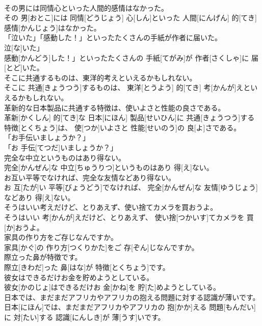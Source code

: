 \documentclass[8pt]{extreport}
\begin{document}
\begin{CJK}{UTF8}{min}
\\	その男には同情心といった人間的感情はなかった。	
\\	その 男[おとこ]には 同情[どうじょう] 心[しん]といった 人間[にんげん] 的[てき] 感情[かんじょう]はなかった。	
\\	「泣いた」「感動した！」といったたくさんの手紙が作者に届いた。	
\\	泣[な]いた」
\\	感動[かんどう]した！」といったたくさんの 手紙[てがみ]が 作者[さくしゃ]に 届[とど]いた。	
\\	そこに共通するものは、東洋的考えといえるかもしれない。	
\\	そこに 共通[きょうつう]するものは、 東洋[とうよう] 的[てき] 考[かんが]えといえるかもしれない。	
\\	革新的な日本製品に共通する特徴は、使いよさと性能の良さである。	
\\	革新[かくしん] 的[てき]な 日本[にほん] 製品[せいひん]に 共通[きょうつう]する 特徴[とくちょう]は、 使[つか]いよさと 性能[せいのう]の 良[よ]さである。	
\\	「お手伝いましょうか？」	
\\	「お 手伝[てつだ]いましょうか？」	
\\	完全な中立というものはあり得ない。	
\\	完全[かんぜん]な 中立[ちゅうりつ]というものはあり 得[え]ない。	
\\	お互い平等でなければ、完全な友情などあり得ない。	
\\	お 互[たが]い 平等[びょうどう]でなければ、 完全[かんぜん]な 友情[ゆうじょう]などあり 得[え]ない。	
\\	そうはいい考えだけど、とりあえず、使い捨てカメラを買おうよ。	
\\	そうはいい 考[かんが]えだけど、とりあえず、 使い捨[つかいす]てカメラを 買[か]おうよ。	
\\	家具の作り方をご存じなんですか。	
\\	家具[かぐ]の 作り方[つくりかた]をご 存[ぞん]じなんですか。	
\\	際立った鼻が特徴です。	
\\	際立[きわだ]った 鼻[はな]が 特徴[とくちょう]です。	
\\	彼女はできるだけお金を貯めようとしている。	
\\	彼女[かのじょ]はできるだけお 金[かね]を 貯[た]めようとしている。	
\\	日本では、まだまだアフリカやアフリカの抱える問題に対する認識が薄いです。	
\\	日本[にほん]では、まだまだアフリカやアフリカの 抱[かか]える 問題[もんだい]に 対[たい]する 認識[にんしき]が 薄[うす]いです。	

\end{CJK}
\end{document}
